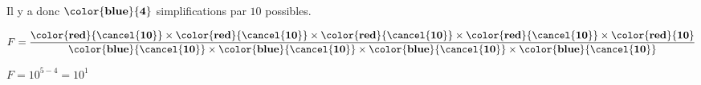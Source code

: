 \begin{enumerate}
            \medskip
            Il y a donc $\mathbf{\color{blue}{4}}$ simplifications par $10$ possibles.

            \medskip
            $F=\dfrac{\mathbf{\color{red}{\cancel{10}}} \times \mathbf{\color{red}{\cancel{10}}}\times \mathbf{\color{red}{\cancel{10}}}\times \mathbf{\color{red}{\cancel{10}}}\times\mathbf{\color{red}{10}}}{\mathbf{\color{blue}{\cancel{10}}} \times \mathbf{\color{blue}{\cancel{10}}}\times \mathbf{\color{blue}{\cancel{10}}}\times \mathbf{\color{blue}{\cancel{10}}}}$

            \medskip
            $F=10^{5-4}=10^{1}$
    \end{enumerate}

